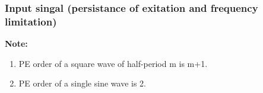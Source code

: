 

\subsubsection{Input singal (persistance of exitation and frequency limitation)}
\textbf{Note:}
\begin{enumerate}
   \item PE order of a square wave of half-period m is m+1.
   \item PE order of a single sine wave is 2.
\end{enumerate}
%
